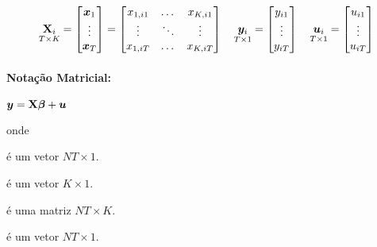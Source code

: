 \documentclass[11pt, oneside, a4paper, article]{article}
\numberwithin{equation}{section}
\begin{document}
\vspace{-1 em}
\begin{align*}
\underset{T \times K}{\mathbf{X}_{i}} = 
\begin{bmatrix}
\boldsymbol{x}_{1} \\ \vdots \\ \boldsymbol{x}_{T}
\end{bmatrix}
=
\begin{bmatrix}
	x_{1,i1} & \dots  & x_{K, i1}	\\
	\vdots          & \ddots &  \vdots \\
	x_{1,iT} & \dots  & x_{K, iT}
\end{bmatrix}
\quad
\underset{T \times 1}{\boldsymbol{y}_{i}} = 
\begin{bmatrix}
y_{i1} \\ \vdots \\ y_{iT}
\end{bmatrix}
\quad
\underset{T \times 1}{\boldsymbol{u}_{i}} = 
\begin{bmatrix}
u_{i1} \\ \vdots \\ u_{iT}
\end{bmatrix}
\end{align*}

\paragraph{Notação Matricial:}
$\boldsymbol{y} = \mathbf{X} \boldsymbol{\beta} + \boldsymbol{u}$

\noindent onde
\vspace{-1 ex}
\begin{description}[noitemsep]
	\item[$\yvec$] é um vetor $NT \times 1$.
	\item[$\betavec$] é um vetor $K \times 1$.
	\item[$\Xmat$] é uma matriz $NT \times K$.
	\item[$\uvec$] é um vetor $NT \times 1$.
\end{description}
\end{document}
